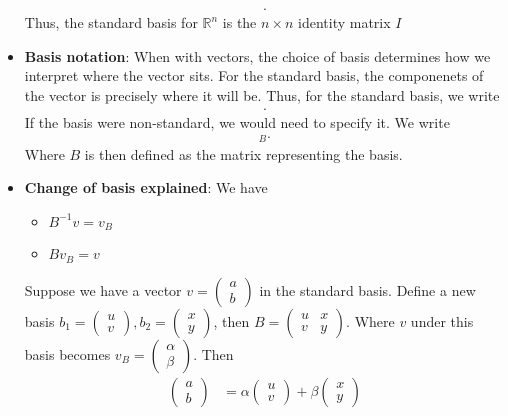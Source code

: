 \documentclass{report}
\begin{document}
\begin{itemize}
\begin{align*}
            .\end{align*}
            \bigbreak \noindent 
            Thus, the standard basis for $\mathbb{R}^{n}$ is the $n\times n$ identity matrix $I$
        \item \textbf{Basis notation}: When with vectors, the choice of basis determines how we interpret where the vector sits. For the standard basis, the componenets of the vector is precisely where it will be. Thus, for the standard basis, we write
            \begin{align*}
                [\vec{\mathbf{v}}]
            .\end{align*}
            If the basis were non-standard, we would need to specify it. We write
            \begin{align*}
                [\vec{\mathbf{v}}]_{B}
            .\end{align*}
            Where $B$ is then defined as the matrix representing the basis.
        \item \textbf{Change of basis explained}: We have
            \begin{itemize}
                \item $B^{-1}v = v_{B}$
                \item $Bv_{B} = v$
            \end{itemize}
            \bigbreak \noindent 
            Suppose we have a vector $v = \begin{pmatrix} a \\ b \end{pmatrix}$ in the standard basis. Define a new basis $b_{1} = \begin{pmatrix} u \\ v \end{pmatrix}, b_{2} = \begin{pmatrix} x \\ y\end{pmatrix}$, then $B = \begin{pmatrix} u & x \\ v & y\end{pmatrix} $. Where $v$ under this basis becomes $v_{B} = \begin{pmatrix} \alpha \\ \beta\end{pmatrix} $. Then
            \begin{align*}
                \begin{pmatrix} a \\ b \end{pmatrix} &= \alpha \begin{pmatrix} u \\ v\end{pmatrix} + \beta \begin{pmatrix} x \\ y\end{pmatrix} \\

\end{align*}
\end{itemize}
\end{document}
